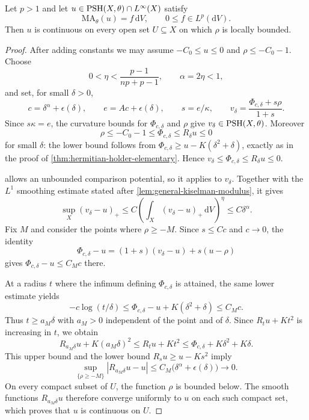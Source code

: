 \begin{theorem}\label{thm:local-big-bounded-continuity}
Let $p>1$ and let $u\in\mathrm{PSH}(X,\theta)\cap L^\infty(X)$ satisfy
\[
 \mathrm{MA}_\theta(u)=f\,\mathrm{d}V,\qquad 0\leq f\in L^p(\mathrm{d}V).
\]
Then $u$ is continuous on every open set $U\subseteq X$ on which $\rho$ is locally bounded.
\end{theorem}
\begin{proof}
After adding constants we may assume $-C_0\leq u\leq0$ and $\rho\leq-C_0-1$. Choose
\[
 0<\eta<\frac{p-1}{np+p-1},\qquad \alpha=2\eta<1,
\]
and set, for small $\delta>0$,
\[
 c=\delta^\alpha+\epsilon(\delta),\qquad
 e=Ac+\epsilon(\delta),\qquad s=e/\kappa,\qquad
 v_\delta=\frac{\Phi_{c,\delta}+s\rho}{1+s}.
\]
Since $s\kappa=e$, the curvature bounds for $\Phi_{c,\delta}$ and $\rho$ give $v_\delta\in\mathrm{PSH}(X,\theta)$. Moreover
\[
 \rho\leq-C_0-1\leq\Phi_{c,\delta}
                  \leq R_\delta u\leq0
\]
for small $\delta$: the lower bound follows from $\Phi_{c,\delta}\geq u-K(\delta^2+\delta)$, exactly as in the proof of \cref{thm:hermitian-holder-elementary}. Hence $v_\delta\leq\Phi_{c,\delta}\leq R_\delta u\leq0$.

 allows an unbounded comparison potential, so it applies to $v_\delta$. Together with the $L^1$ smoothing estimate stated after \cref{lem:general-kiselman-modulus}, it gives
\[
 \sup_X(v_\delta-u)_+
 \leq C\left(\int_X(v_\delta-u)_+\,\mathrm{d}V\right)^\eta
 \leq C\delta^\alpha.
\]
Fix $M$ and consider the points where $\rho\geq-M$. Since $s\leq Cc$ and $c\to0$, the identity
\[
 \Phi_{c,\delta}-u=(1+s)(v_\delta-u)+s(u-\rho)
\]
gives $\Phi_{c,\delta}-u\leq C_Mc$ there.

At a radius $t$ where the infimum defining $\Phi_{c,\delta}$ is attained, the same lower estimate yields
\[
 -c\log(t/\delta)
       \leq\Phi_{c,\delta}-u+K(\delta^2+\delta)
       \leq C_Mc.
\]
Thus $t\geq a_M\delta$ with $a_M>0$ independent of the point and of $\delta$. Since $R_tu+Kt^2$ is increasing in $t$, we obtain
\[
 R_{a_M\delta}u+K(a_M\delta)^2
       \leq R_tu+Kt^2
       \leq\Phi_{c,\delta}+K\delta^2+K\delta.
\]
This upper bound and the lower bound $R_su\geq u-Ks^2$ imply
\[
 \sup_{\{\rho\geq-M\}}
       |R_{a_M\delta}u-u|
       \leq C_M\bigl(\delta^\alpha+\epsilon(\delta)\bigr)
                       \longrightarrow0.
\]
On every compact subset of $U$, the function $\rho$ is bounded below. The smooth functions $R_{a_M\delta}u$ therefore converge uniformly to $u$ on each such compact set, which proves that $u$ is continuous on $U$.
\end{proof}

